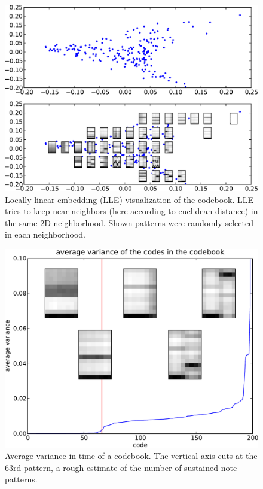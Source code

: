 \documentclass{article}
\begin{document}
\begin{figure}[htb]
\begin{center}
\includegraphics[width=.9\columnwidth]{codes_lle}
\end{center}
\caption{\small{
Locally linear embedding (LLE) visualization of the codebook.
LLE tries to keep near neighbors (here according to euclidean distance)
in the same $2$D neighborhood. Shown patterns were randomly selected
in each neighborhood.
}}
\label{fig:lle}
\end{figure}

\begin{figure}[htb]
\begin{center}
\includegraphics[width=.9\columnwidth]{code_variance}
\end{center}
\caption{\small{Average variance in time of a codebook. The vertical
axis cuts at the $63$rd pattern, a rough estimate of the number of 
sustained note patterns.
}}
\label{fig:code_var}
\end{figure}
\end{document}
